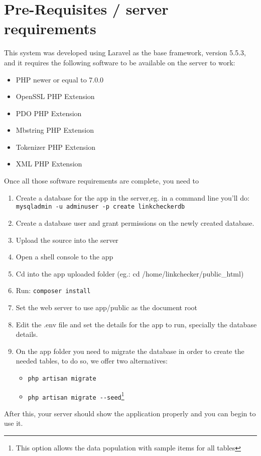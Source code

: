 \section{Pre-Requisites / server requirements}
This system was developed using Laravel as the base framework, version 5.5.3, and it requires the following software to be available on the server to work:

\begin{itemize}
	\item PHP newer or equal to 7.0.0
	\item OpenSSL PHP Extension
	\item PDO PHP Extension
	\item Mbstring PHP Extension
	\item Tokenizer PHP Extension
	\item XML PHP Extension
\end{itemize}

Once all those software requirements are complete, you need to 

\begin{enumerate}
	\item Create a database for the app in the server,eg. in a command line you'll do: \verb|mysqladmin -u adminuser -p create linkcheckerdb|
	\item Create a database user and grant permissions on the newly created database.
	\item Upload the source into the server
	\item Open a shell console to the app
	\item Cd into the app uploaded folder (eg.: cd /home/linkchecker/public\_html)
	\item Run: \verb|composer install|
	\item Set the web server to use app/public as the document root 
	\item Edit the .env file and set the details for the app to run, specially the database details.
	\item On the app folder you need to migrate the database in order to create the needed tables, to do so, we offer two alternatives:
	\begin{itemize}
		\item \verb|php artisan migrate| 
		\item \verb|php artisan migrate --seed|\footnote{This option allows the data population with sample items for all tables}
	\end{itemize}
\end{enumerate}
After this, your server should show the application properly and you can begin to use it.

